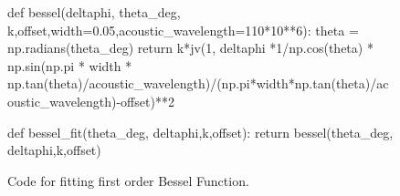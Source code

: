 \documentclass[aps,prl,reprint,10pt,amsmath,amssymb,superscriptaddress,a4paper]{revtex4-2}
\begin{document}
\begin{figure}
    \begin{python}
    def bessel(deltaphi, theta_deg, k,offset,width=0.05,acoustic_wavelength=110*10**6):
        theta = np.radians(theta_deg)
        return k*jv(1, deltaphi *1/np.cos(theta) * np.sin(np.pi * width * np.tan(theta)/acoustic_wavelength)/(np.pi*width*np.tan(theta)/acoustic_wavelength)-offset)**2

    def bessel_fit(theta_deg, deltaphi,k,offset):
        return bessel(theta_deg, deltaphi,k,offset)
    \end{python}
    \caption{Code for fitting first order Bessel Function.}
\end{figure}



\end{document}
